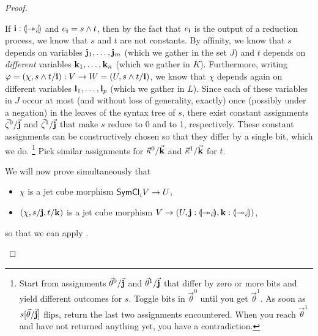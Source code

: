 \documentclass[a4paper]{article}
\begin{document}
\begin{proof}
\begin{itemize}
		If $\mathbf{i} : {\llparenthesis \rightarrowtriangle_i \rrparenthesis}$ and $e_{\mathbf{i}} = s \wedge t$, then by the fact that $e_{\mathbf{i}}$ is the output of a reduction process, we know that $s$ and $t$ are not constants.
		By affinity, we know that $s$ depends on variables $\mathbf{j}_1, \ldots, \mathbf{j}_m$ (which we gather in the set $J$) and $t$ depends on \emph{different} variables $\mathbf{k}_1, \ldots, \mathbf{k}_n$ (which we gather in $K$).
		Furthermore, writing $\varphi = (\chi, s \wedge t / \mathbf{i}) : V \to W = (U, s \wedge t / \mathbf{i})$, we know that $\chi$ depends again on different variables $\mathbf{l}_1, \ldots, \mathbf{l}_p$ (which we gather in $L$).
		Since each of these variables in $J$ occur at most (and without loss of generality, exactly) once (possibly under a negation) in the leaves of the syntax tree of $s$, there exist constant assignments $\vec \zeta^0/\vec{\mathbf{j}}$ and $\vec \zeta^1/\vec{\mathbf{j}}$ that make $s$ reduce to 0 and to 1, respectively.
		These constant assignments can be constructively chosen so that they differ by a single bit, which we do.%
		\footnote{Start from assignments $\vec \theta^0/\vec{\mathbf{j}}$ and $\vec \theta^1/\vec{\mathbf{j}}$ that differ by zero or more bits and yield different outcomes for $s$.
		Toggle bits in $\vec \theta^0$ until you get $\vec \theta^1$.
		As soon as $s[\vec \theta/\vec{\mathbf{j}}]$ flips, return the last two assignments encountered.
		When you reach $\vec \theta^1$ and have not returned anything yet, you have a contradiction.}
		Pick similar assignments for $\vec \kappa^0/\vec{\mathbf{k}}$ and $\vec \kappa^1/\vec{\mathbf{k}}$ for $t$.
	
		We will now prove simultaneously that
		\begin{itemize}
			\item $\chi$ is a jet cube morphism $\mathsf{SymCl}_i V \to U$,
			\item $(\chi, s / \mathbf{j}, t / \mathbf{k})$ is a jet cube morphism $V \to (U, \mathbf{j} : {\llparenthesis \rightarrowtriangle_i \rrparenthesis}, \mathbf{k} : {\llparenthesis \rightarrowtriangle_i \rrparenthesis})$,
		\end{itemize}
		so that we can apply .
		

\end{itemize}
\end{proof}
\end{document}
